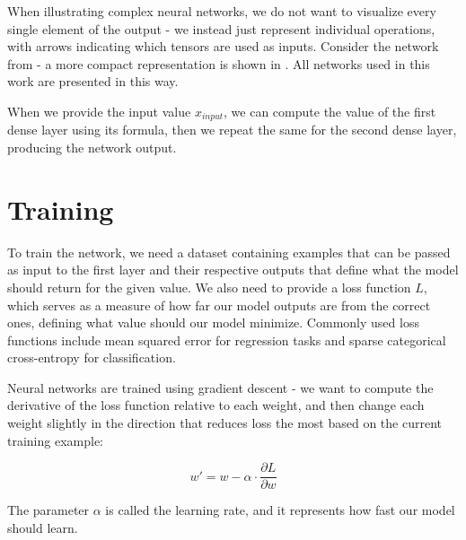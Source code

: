 
When illustrating complex neural networks, we do not want to visualize every single element of the output - we instead just represent individual operations, with arrows indicating which tensors are used as inputs. Consider the network from  - a more compact representation is shown in . All networks used in this work are presented in this way.




When we provide the input value $x_{input}$, we can compute the value of the first dense layer using its formula, then we repeat the same for the second dense layer, producing the network output.

\section{Training}

To train the network, we need a dataset containing examples that can be passed as input to the first layer and their respective outputs that define what the model should return for the given value. We also need to provide a loss function $L$, which serves as a measure of how far our model outputs are from the correct ones, defining what value should our model minimize. Commonly used loss functions include mean squared error for regression tasks and sparse categorical cross-entropy for classification.

Neural networks are trained using gradient descent - we want to compute the derivative of the loss function relative to each weight, and then change each weight slightly in the direction that reduces loss the most based on the current training example:

$$w' = w - \alpha \cdot \frac{\partial L}{\partial w}$$

The parameter $\alpha$ is called the learning rate, and it represents how fast our model should learn.

